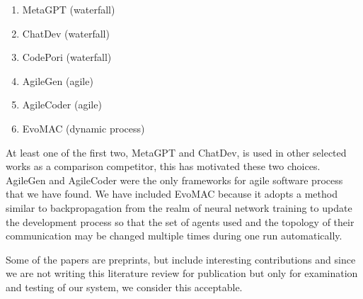 \begin{enumerate}
	\item MetaGPT \cite{hong2024metagptmetaprogrammingmultiagent}  (waterfall)
	\item ChatDev \cite{qian2024chatdevcommunicativeagentssoftware} (waterfall)
	\item CodePori \cite{rasheed2024codeporilargescaleautonomoussoftware} (waterfall) 
	\item AgileGen \cite{zhang2024empoweringagilebasedgenerativesoftware} (agile)
	\item AgileCoder \cite{nguyen2024agilecoderdynamiccollaborativeagents} (agile)
	\item EvoMAC \cite{hu2024selfevolvingmultiagentcollaborationnetworks} (dynamic process)
\end{enumerate}

At least one of the first two, MetaGPT and ChatDev, is used in other selected works as a comparison competitor, this has motivated these two choices. AgileGen and AgileCoder were the only frameworks for agile software process that we have found. We have included EvoMAC because it adopts a method similar to backpropagation from the realm of neural network training to update the development process so that the set of agents used and the topology of their communication may be changed multiple times during one run automatically.


Some of the papers are preprints, but include interesting contributions and since we are not writing this literature review for publication but only for examination and testing of our system, we consider this acceptable.




